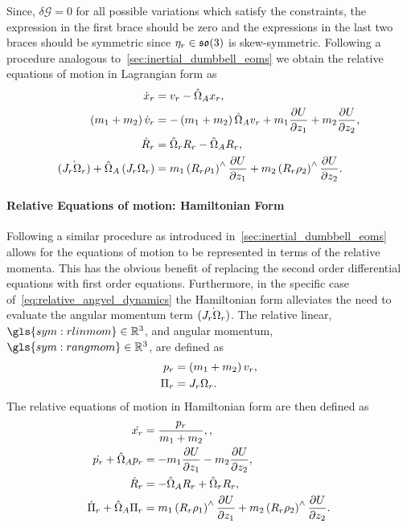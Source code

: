 Since, \( \delta \mathcal{G} = 0 \) for all possible variations which satisfy the constraints, the expression in the first brace should be zero and the expressions in the last two braces should be symmetric since \( \eta_r \in \mathfrak{so}(3) \) is skew-symmetric.
Following a procedure analogous to~\cref{sec:inertial_dumbbell_eoms} we obtain the relative equations of motion in Lagrangian form as
\begin{align}
    \dot{x}_r &= v_r - \hat{\Omega}_A x_r, \label{eq:relative_position_dynamics}\\
    \left( m_1 + m_2 \right) \dot{v}_r  &= -\left( m_1 + m_2 \right) \hat{\Omega}_A v_r + m_1 \frac{\partial U}{\partial z_1} + m_2 \frac{\partial U}{\partial z_2}, \label{eq:relative_velocity_dynamics} \\
    \dot{R}_r &= \hat{\Omega}_r R_r  - \hat{\Omega}_A R_r , \label{eq:relative_attitude_dynamics}\\
    \dot{\left( J_r  \Omega_r \right)} + \hat{\Omega}_A \left( J_r  \Omega_r \right) &= m_1 \left( R_r  \rho_1 \right)^\wedge \frac{\partial U}{\partial z_1} + m_2 \left( R_r  \rho_2 \right)^\wedge \frac{\partial U}{\partial z_2}.\label{eq:relative_angvel_dynamics}
\end{align}

\paragraph{Relative Equations of motion: Hamiltonian Form}
Following a similar procedure as introduced in~\cref{sec:inertial_dumbbell_eoms} allows for the equations of motion to be represented in terms of the relative momenta.
This has the obvious benefit of replacing the second order differential equations with first order equations.
Furthermore, in the specific case of~\cref{eq:relative_angvel_dynamics} the Hamiltonian form alleviates the need to evaluate the angular momentum term \( \dot{\left( J_r \Omega_r \right)}\).
The relative linear, \( \gls{sym:rlinmom} \in \R^3 \), and angular momentum, \( \gls{sym:rangmom} \in \R^3 \), are defined as
\begin{align}
    p_r &= \left( m_1 + m_2 \right) v_r, \label{eq:relative_linear_momentum}\\ 
    \Pi_r &= J_r \Omega_r. \label{eq:relative_angular_momentum}
\end{align}
The relative equations of motion in Hamiltonian form are then defined as
\begin{align}
    \dot {x_r} &= \frac{p_r}{m_1 + m_2}, \label{eq:relative_position_dynamics_hamiltonian},\\
    \dot {p_r} + \hat{\Omega}_A p_r &= - m_1 \frac{\partial U}{\partial z_1} - m_2 \frac{\partial U}{\partial z_2}, \label{eq:relative_velocity_dynamics_hamiltonian}\\
    \dot{R}_r &= - \hat{\Omega}_A R_r +\hat{\Omega}_r R_r, \label{eq:relative_attitude_dynamics_hamiltonian}\\
    \dot{\Pi}_r + \hat{\Omega}_A \Pi_r &= m_1 \left( R_r \rho_1 \right)^\wedge \frac{\partial U}{\partial z_1} + m_2 \left( R_r \rho_2 \right)^\wedge \frac{\partial U}{\partial z_2}. \label{eq:relative_angvel_dynamics_hamiltonian}
\end{align}

